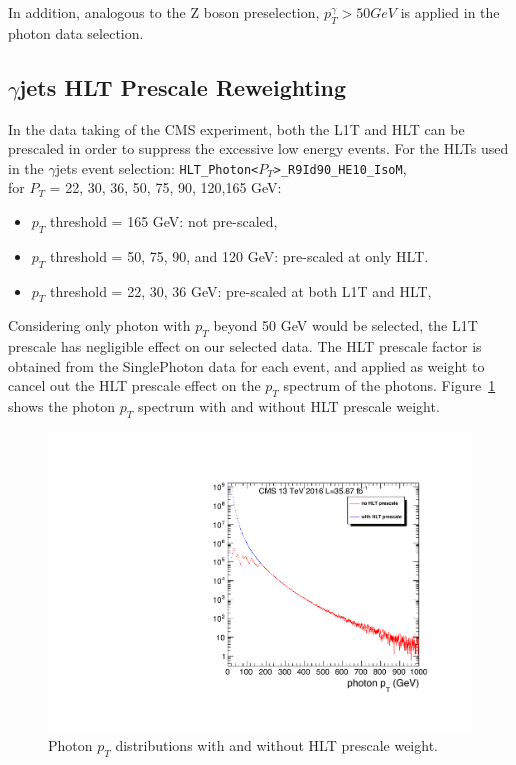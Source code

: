 In addition, analogous to the Z boson preselection, $p_T ^{\gamma} > 50GeV$ is applied in the photon data selection.

\subsection{$\gamma$jets HLT Prescale Reweighting}
In the data taking of the CMS experiment, both the L1T and HLT can be prescaled in order to suppress the excessive low energy events. For the HLTs used in the $\gamma$jets event selection:
\texttt{HLT\_Photon<$P_T$>\_R9Id90\_HE10\_IsoM}, \\
 for $P_T$ = 22, 30, 36, 50, 75, 90, 120,165 GeV:
\begin{itemize}
\item $p_T$ threshold = 165 GeV: not pre-scaled, 
\item $p_T$ threshold = 50, 75, 90, and 120 GeV:  pre-scaled at only HLT.  
\item $p_T$ threshold = 22, 30, 36 GeV: pre-scaled at both L1T and HLT, 
\end{itemize}

Considering only photon with $p_T$ beyond 50 GeV would be selected, the L1T prescale has negligible effect on our selected data. The HLT prescale factor is obtained from the SinglePhoton data for each event, and applied as weight to cancel out the HLT prescale effect on the $p_T$ spectrum of the photons. Figure~\ref{fig:photon_pt_prescale} shows the photon $p_T$ spectrum with and without HLT prescale weight.


\begin{figure}[htbp]
\begin{center}
\includegraphics[width=0.86\linewidth]{figures/bg_photonHLT_reweight.pdf}
\caption{Photon $p_T$ distributions with and without HLT prescale weight. }
\label{fig:photon_pt_prescale}
\end{center}
\end{figure}

